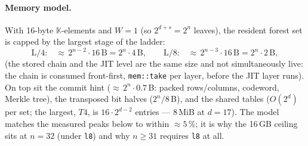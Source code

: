 \documentclass[11pt]{article}
\newcommand{\K}{\mathbb{K}}            %
\newcommand{\code}[1]{{\def\_{\textunderscore\allowbreak}\texttt{#1}}}
\theoremstyle{definition}
\begin{document}
\paragraph{Memory model.}
With 16-byte $\K$-elements and $W = 1$ (so $2^{d+s} = 2^n$ leaves), the
resident forest set is capped by the largest stage of the ladder:
\[
  \text{L/4:}\quad
  {\approx}\,2^{n-2}\cdot 16\,\mathrm{B} = 2^n\cdot 4\,\mathrm{B},
  \qquad
  \text{L/8:}\quad
  {\approx}\,2^{n-3}\cdot 16\,\mathrm{B} = 2^n\cdot 2\,\mathrm{B},
\]
(the stored chain and the JIT level are the same size and not
simultaneously live: the chain is consumed front-first,
\code{mem::take} per layer, before the JIT layer runs).  On top sit the
commit hint (${\approx}\,2^n\cdot 0.7$\,B: packed rows/columns,
codeword, Merkle tree), the transposed bit halves ($2^n/8$\,B), and the
shared tables ($O(2^d)$ per set; the largest, $T4$, is
$16\cdot 2^{d-2}$ entries --- 8\,MiB at $d = 17$).  The model matches
the measured peaks below to within ${\approx}5\,\%$; it is why the
16\,GB ceiling sits at $n = 32$ (under \code{l8}) and why $n \ge 31$
requires \code{l8} at all.
\end{document}
